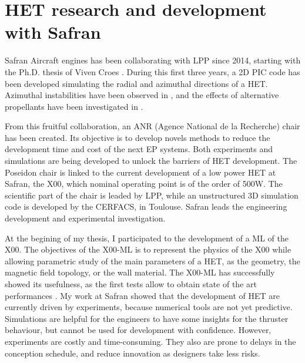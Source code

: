 

\section*{\ac{HET} research and development with Safran}
\label{sec-poseidon}



Safran Aircraft engines has been collaborating with \ac{LPP} since 2014, starting with the Ph.D. thesis of Viven Croes \citep{croes2017}.
During this first three years, a \ac{2D} \ac{PIC} code has been developed simulating the radial and azimuthal directions of a \ac{HET}.
Azimuthal instabilities have been observed in \citet{croes2017a}, and the effects of alternative propellants have been investigated in \citet{croes2018}.

From this fruitful collaboration, an ANR (Agence National de la Recherche) chair has been created.
Its objective is to develop novels methods to reduce the development time and cost of the next \ac{EP} systems.
Both experiments and simulations are being developed to unlock the barriers of \ac{HET} development.
The {\sc Poseidon} chair is linked to the current development of a  low power \ac{HET} at Safran, the \PPS X00, which nominal operating point is of the order of 500W.
The scientific part of the chair is leaded by \ac{LPP}, while an unstructured \ac{3D} simulation code is developed by the CERFACS, in Toulouse.
Safran leads the engineering development and experimental investigation.

At the begining of my thesis, I participated to the development of a \ac{ML} of the \PPS X00.
The objectives of the \PPS X00-\ac{ML}  is to represent the physics of the \PPS X00 while allowing parametric study of the main parameters of a \ac{HET}, as the geometry, the magnetic field topology, or the wall material.
The \PPS X00-\ac{ML} has successfully showed its usefulness, as the first tests allow to obtain state of the art performances \citep{vaudolon2018}.
My work at Safran showed that the development of \ac{HET} are currently driven by experiments, because numerical tools are not yet predictive.
Simulations are helpful for the engineers to have some insights for the thruster behaviour, but cannot be used for development with confidence.
However, experiments are costly and time-consuming.
They also are prone to delays in the conception schedule, and reduce innovation as designers take less risks.

